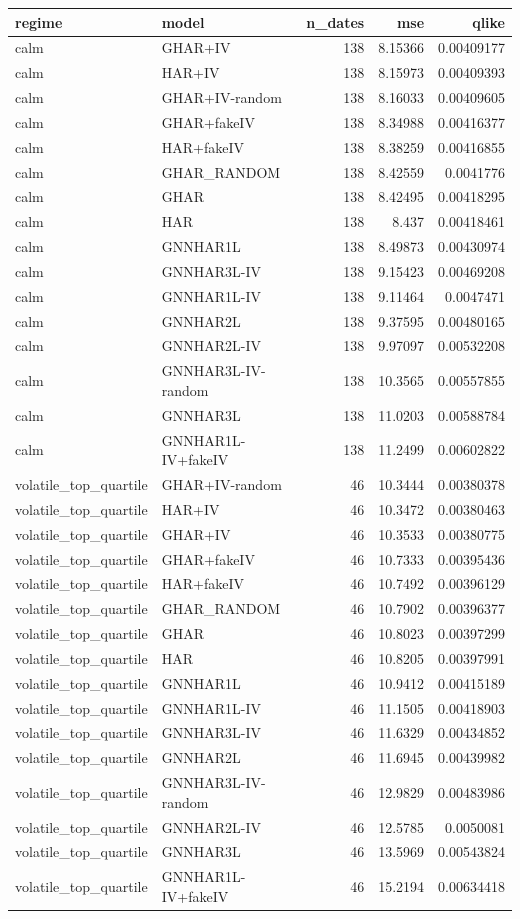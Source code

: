 \begin{tabular}{llrrr}
\toprule
regime & model & n_dates & mse & qlike \\
\midrule
calm & GHAR+IV & 138 & 8.15366 & 0.00409177 \\
calm & HAR+IV & 138 & 8.15973 & 0.00409393 \\
calm & GHAR+IV-random & 138 & 8.16033 & 0.00409605 \\
calm & GHAR+fakeIV & 138 & 8.34988 & 0.00416377 \\
calm & HAR+fakeIV & 138 & 8.38259 & 0.00416855 \\
calm & GHAR_RANDOM & 138 & 8.42559 & 0.0041776 \\
calm & GHAR & 138 & 8.42495 & 0.00418295 \\
calm & HAR & 138 & 8.437 & 0.00418461 \\
calm & GNNHAR1L & 138 & 8.49873 & 0.00430974 \\
calm & GNNHAR3L-IV & 138 & 9.15423 & 0.00469208 \\
calm & GNNHAR1L-IV & 138 & 9.11464 & 0.0047471 \\
calm & GNNHAR2L & 138 & 9.37595 & 0.00480165 \\
calm & GNNHAR2L-IV & 138 & 9.97097 & 0.00532208 \\
calm & GNNHAR3L-IV-random & 138 & 10.3565 & 0.00557855 \\
calm & GNNHAR3L & 138 & 11.0203 & 0.00588784 \\
calm & GNNHAR1L-IV+fakeIV & 138 & 11.2499 & 0.00602822 \\
volatile_top_quartile & GHAR+IV-random & 46 & 10.3444 & 0.00380378 \\
volatile_top_quartile & HAR+IV & 46 & 10.3472 & 0.00380463 \\
volatile_top_quartile & GHAR+IV & 46 & 10.3533 & 0.00380775 \\
volatile_top_quartile & GHAR+fakeIV & 46 & 10.7333 & 0.00395436 \\
volatile_top_quartile & HAR+fakeIV & 46 & 10.7492 & 0.00396129 \\
volatile_top_quartile & GHAR_RANDOM & 46 & 10.7902 & 0.00396377 \\
volatile_top_quartile & GHAR & 46 & 10.8023 & 0.00397299 \\
volatile_top_quartile & HAR & 46 & 10.8205 & 0.00397991 \\
volatile_top_quartile & GNNHAR1L & 46 & 10.9412 & 0.00415189 \\
volatile_top_quartile & GNNHAR1L-IV & 46 & 11.1505 & 0.00418903 \\
volatile_top_quartile & GNNHAR3L-IV & 46 & 11.6329 & 0.00434852 \\
volatile_top_quartile & GNNHAR2L & 46 & 11.6945 & 0.00439982 \\
volatile_top_quartile & GNNHAR3L-IV-random & 46 & 12.9829 & 0.00483986 \\
volatile_top_quartile & GNNHAR2L-IV & 46 & 12.5785 & 0.0050081 \\
volatile_top_quartile & GNNHAR3L & 46 & 13.5969 & 0.00543824 \\
volatile_top_quartile & GNNHAR1L-IV+fakeIV & 46 & 15.2194 & 0.00634418 \\
\bottomrule
\end{tabular}

